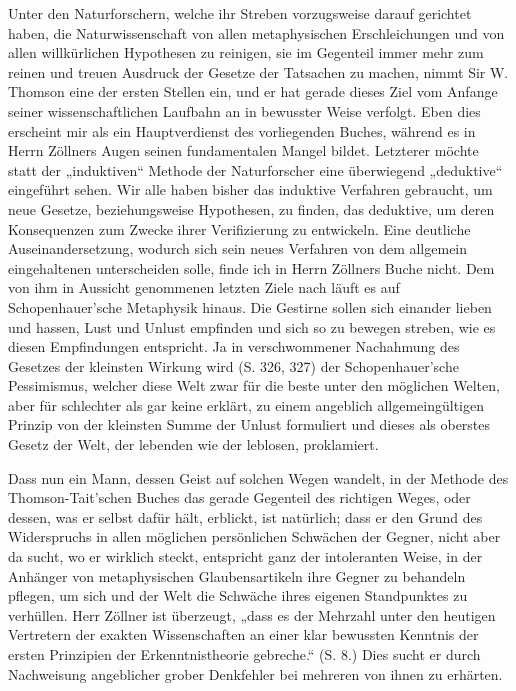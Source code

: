 \documentclass[a4paper, 11pt, oneside, german]{article}
\begin{document}
Unter den Naturforschern, welche ihr Streben vorzugsweise darauf gerichtet haben, die Naturwissenschaft von allen metaphysischen Erschleichungen und von allen willkürlichen Hypothesen zu reinigen, sie im Gegenteil immer mehr zum reinen und treuen Ausdruck der Gesetze der Tatsachen zu machen, nimmt Sir W. Thomson eine der ersten Stellen ein, und er hat gerade dieses Ziel vom Anfange seiner wissenschaftlichen Laufbahn an in bewusster Weise verfolgt. Eben dies erscheint mir als ein Hauptverdienst des vorliegenden Buches, während es in Herrn Zöllners Augen seinen fundamentalen Mangel bildet. Letzterer möchte statt der „induktiven“ Methode der Naturforscher eine überwiegend „deduktive“ eingeführt sehen. Wir alle haben bisher das induktive Verfahren gebraucht, um neue Gesetze, beziehungsweise Hypothesen, zu finden, das deduktive, um deren Konsequenzen zum Zwecke ihrer Verifizierung zu entwickeln. Eine deutliche Auseinandersetzung, wodurch sich sein neues Verfahren von dem allgemein eingehaltenen unterscheiden solle, finde ich in Herrn Zöllners Buche nicht. Dem von ihm in Aussicht genommenen letzten Ziele nach läuft es auf Schopenhauer'sche Metaphysik hinaus. Die Gestirne sollen sich einander lieben und hassen, Lust und Unlust empfinden und sich so zu bewegen streben, wie es diesen Empfindungen entspricht. Ja in verschwommener Nachahmung des Gesetzes der kleinsten Wirkung wird (S. 326, 327) der Schopenhauer'sche Pessimismus, welcher diese Welt zwar für die beste unter den möglichen Welten, aber für schlechter als gar keine erklärt, zu einem angeblich allgemeingültigen Prinzip von der kleinsten Summe der Unlust formuliert und dieses als oberstes Gesetz der Welt, der lebenden wie der leblosen, proklamiert.

Dass nun ein Mann, dessen Geist auf solchen Wegen wandelt, in der Methode des Thomson-Tait'schen Buches das gerade Gegenteil des richtigen Weges, oder dessen, was er selbst dafür hält, erblickt, ist natürlich; dass er den Grund des Widerspruchs in allen möglichen persönlichen Schwächen der Gegner, nicht aber da sucht, wo er wirklich steckt, entspricht ganz der intoleranten Weise, in der Anhänger von metaphysischen Glaubensartikeln ihre Gegner zu behandeln pflegen, um sich und der Welt die Schwäche ihres eigenen Standpunktes zu verhüllen. Herr Zöllner ist überzeugt, „dass es der Mehrzahl unter den heutigen Vertretern der exakten Wissenschaften an einer klar bewussten Kenntnis der ersten Prinzipien der Erkenntnistheorie gebreche.“ (S. 8.) Dies sucht er durch Nachweisung angeblicher grober Denkfehler bei mehreren von ihnen zu erhärten.
\end{document}
